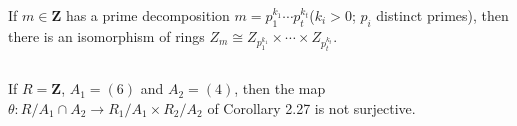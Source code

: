 $$ $$

\begin{ex}
    If $m\in \mathbf{Z}$ has a prime decomposition $m=p_{1}^{k_{1}}\cdots p_{t}^{k_{t}}$($k_{i}>0$; $p_{i}$ distinct primes), then there is an isomorphism of rings $Z_{m}\cong Z_{p_{1}^{k_{1}}}\times \cdots\times Z_{p_{t}^{k_{t}}}$.
\end{ex}

$$ $$

\begin{ex}
    If $R=\mathbf{Z}$, $A_{1}=(6)$ and $A_{2}=(4)$, then the map $\theta :R /A_{1}\cap A_{2}\to R_{1} /A_{1}\times R_{2} /A_{2}$ of Corollary 2.27 is not surjective.
\end{ex}